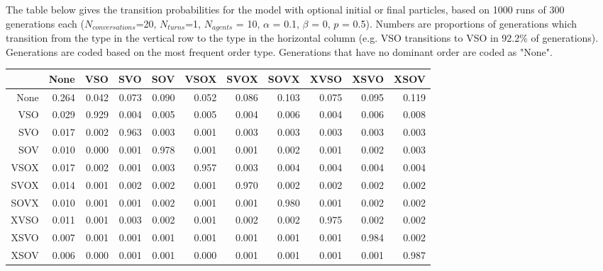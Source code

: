 \documentclass[12pt]{article}
\begin{document}
The table below gives the transition probabilities for the model with optional initial or final particles, based on 1000 runs of 300 generations each ($N_{conversations}$=20, $N_{turns}$=1, $N_{agents}$ = 10, $\alpha$ = 0.1, $\beta$ = 0, $p$ = 0.5).  Numbers are proportions of generations which transition from the type in the vertical row to the type in the horizontal column (e.g. VSO transitions to VSO in 92.2\% of generations).  Generations are coded based on the most frequent order type.  Generations that have no dominant order are coded as "None".

\begin{table}[ht]
\centering
\begin{tabular}{rrrrrrrrrrr}
  \hline
 & None & VSO & SVO & SOV & VSOX & SVOX & SOVX & XVSO & XSVO & XSOV \\ 
  \hline
None & 0.264 & 0.042 & 0.073 & 0.090 & 0.052 & 0.086 & 0.103 & 0.075 & 0.095 & 0.119 \\ 
  VSO & 0.029 & 0.929 & 0.004 & 0.005 & 0.005 & 0.004 & 0.006 & 0.004 & 0.006 & 0.008 \\ 
  SVO & 0.017 & 0.002 & 0.963 & 0.003 & 0.001 & 0.003 & 0.003 & 0.003 & 0.003 & 0.003 \\ 
  SOV & 0.010 & 0.000 & 0.001 & 0.978 & 0.001 & 0.001 & 0.002 & 0.001 & 0.002 & 0.003 \\ 
  VSOX & 0.017 & 0.002 & 0.001 & 0.003 & 0.957 & 0.003 & 0.004 & 0.004 & 0.004 & 0.004 \\ 
  SVOX & 0.014 & 0.001 & 0.002 & 0.002 & 0.001 & 0.970 & 0.002 & 0.002 & 0.002 & 0.002 \\ 
  SOVX & 0.010 & 0.001 & 0.001 & 0.002 & 0.001 & 0.001 & 0.980 & 0.001 & 0.002 & 0.002 \\ 
  XVSO & 0.011 & 0.001 & 0.003 & 0.002 & 0.001 & 0.002 & 0.002 & 0.975 & 0.002 & 0.002 \\ 
  XSVO & 0.007 & 0.001 & 0.001 & 0.001 & 0.001 & 0.001 & 0.001 & 0.001 & 0.984 & 0.002 \\ 
  XSOV & 0.006 & 0.000 & 0.001 & 0.001 & 0.000 & 0.001 & 0.001 & 0.001 & 0.001 & 0.987 \\ 
   \hline
\end{tabular}
\end{table}



\end{document}
